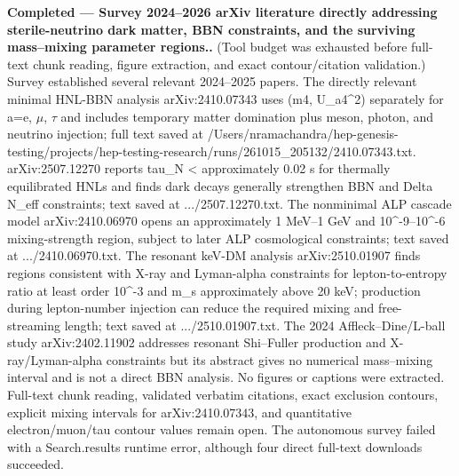 \documentclass[11pt,a4paper]{article}
\begin{document}
\textbf{Completed --- Survey 2024--2026 arXiv literature directly addressing sterile-neutrino dark matter, BBN constraints, and the surviving mass--mixing parameter regions..} (Tool budget was exhausted before full-text chunk reading, figure extraction, and exact contour/citation validation.) Survey established several relevant 2024--2025 papers. The directly relevant minimal HNL-BBN analysis arXiv:2410.07343 uses (m4, \textbar{}U\_a4\textbar{}\textasciicircum{}2) separately for a=e, $\mu$, $\tau$ and includes temporary matter domination plus meson, photon, and neutrino injection; full text saved at /Users/nramachandra/hep-genesis-testing/projects/hep-testing-research/runs/261015\_205132/2410.07343.txt. arXiv:2507.12270 reports tau\_N \textless{} approximately 0.02 s for thermally equilibrated HNLs and finds dark decays generally strengthen BBN and Delta N\_eff constraints; text saved at .../2507.12270.txt. The nonminimal ALP cascade model arXiv:2410.06970 opens an approximately 1 MeV--1 GeV and 10\textasciicircum{}-9--10\textasciicircum{}-6 mixing-strength region, subject to later ALP cosmological constraints; text saved at .../2410.06970.txt. The resonant keV-DM analysis arXiv:2510.01907 finds regions consistent with X-ray and Lyman-alpha constraints for lepton-to-entropy ratio at least order 10\textasciicircum{}-3 and m\_s approximately above 20 keV; production during lepton-number injection can reduce the required mixing and free-streaming length; text saved at .../2510.01907.txt. The 2024 Affleck--Dine/L-ball study arXiv:2402.11902 addresses resonant Shi--Fuller production and X-ray/Lyman-alpha constraints but its abstract gives no numerical mass--mixing interval and is not a direct BBN analysis. No figures or captions were extracted. Full-text chunk reading, validated verbatim citations, exact exclusion contours, explicit mixing intervals for arXiv:2410.07343, and quantitative electron/muon/tau contour values remain open. The autonomous survey failed with a Search.results runtime error, although four direct full-text downloads succeeded.
\end{document}
